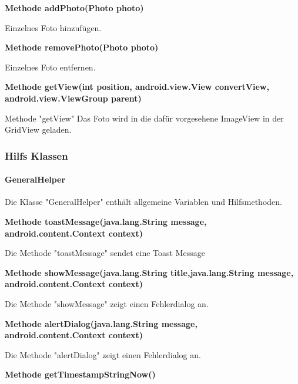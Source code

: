 \documentclass{scrartcl}
\begin{document}
\noindent\textbf{Methode addPhoto(Photo photo)}

\noindent Einzelnes Foto hinzufügen. \newline 

\noindent\textbf{Methode removePhoto(Photo photo)}

\noindent Einzelnes Foto entfernen. \newline 

\noindent\textbf{Methode getView(int position, \newline                              android.view.View convertView, android.view.ViewGroup parent)}

\noindent Methode "getView" Das Foto wird in die dafür vorgesehene ImageView in der GridView geladen. \newline 

\newpage

\subsubsection{Hilfs Klassen}

\paragraph{GeneralHelper}
Die Klasse "GeneralHelper" enthält allgemeine Variablen und Hilfsmethoden. \newline 

\noindent\textbf{Methode toastMessage(java.lang.String message, \newline                   android.content.Context context)}

\noindent Die Methode "toastMessage" sendet eine Toast Message \newline

\noindent\textbf{Methode showMessage(java.lang.String title,\newline  java.lang.String message, android.content.Context context)}

\noindent Die Methode "showMessage" zeigt einen Fehlerdialog an. \newline

\noindent\textbf{Methode alertDialog(java.lang.String message, \newline  android.content.Context context)}

\noindent Die Methode "alertDialog" zeigt einen Fehlerdialog an. \newline

\noindent\textbf{Methode getTimestampStringNow()}
\end{document}
